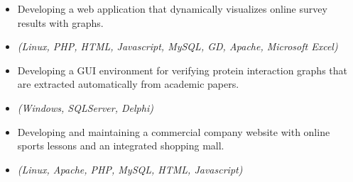   \begin{itemize}
     \item{Developing a web application that dynamically visualizes online survey results with graphs.}
     \item{\it\small(Linux, PHP, HTML, Javascript, MySQL, GD, Apache, Microsoft Excel)}
  \end{itemize}

\begin{itemize}
 \item {Developing a GUI environment for verifying protein interaction graphs
	 that are extracted automatically from academic papers.}
 \item{\it\small(Windows, SQLServer, Delphi)}
\end{itemize}

\begin{itemize}
 \item{Developing and maintaining a commercial company website with 
       online sports lessons and an integrated shopping mall.}
 \item{\it\small(Linux, Apache, PHP, MySQL, HTML, Javascript)}
\end{itemize}
